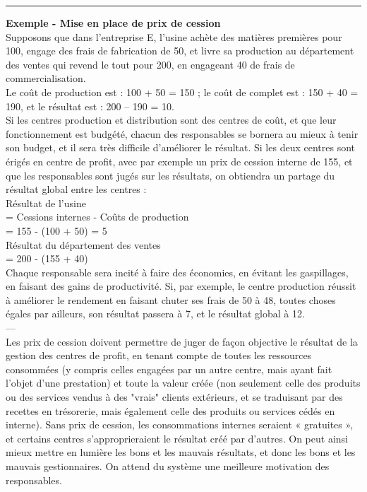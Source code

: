 \documentclass{kaobook}
\begin{document}
\noindent\rule{\textwidth}{0.5pt}
\textbf{Exemple - Mise en place de prix de cession}\\
Supposons que dans l’entreprise E, l'usine achète des matières premières pour 100, engage des frais de fabrication de 50, et livre sa production au département des ventes qui revend le tout pour 200, en engageant 40 de frais de commercialisation.\\
Le coût de production est : 100 + 50 = 150 ; le coût de complet est : 150 + 40 = 190, et le résultat est : 200 – 190 = 10.\\
Si les centres production et distribution sont des centres de coût, et que leur fonctionnement est budgété, chacun des responsables se bornera au mieux à tenir son budget, et il sera très difficile d’améliorer le résultat. Si les deux centres sont érigés en centre de profit, avec par exemple un prix de cession interne de 155, et que les responsables sont jugés sur les résultats, on obtiendra un partage du résultat global entre les centres :\\
Résultat de l'usine\\
= Cessions internes - Coûts de production\\
= 155 - (100 + 50) = 5\\
Résultat du département des ventes\\
= 200 - (155 + 40)\\
Chaque responsable sera incité à faire des économies, en évitant les gaspillages, en faisant des gains de productivité. Si, par exemple, le centre production réussit à améliorer le rendement en faisant chuter ses frais de 50 à 48, toutes choses égales par ailleurs, son résultat passera à 7, et le résultat global à 12.\\
---\\

Les prix de cession doivent permettre de juger de façon objective le résultat de la gestion des centres de profit, en tenant compte de toutes les ressources consommées (y compris celles engagées par un autre centre, mais ayant fait l’objet d’une prestation) et toute la valeur créée (non seulement celle des produits ou des services vendus à des "vrais" clients extérieurs, et se traduisant par des recettes en trésorerie, mais également celle des produits ou services cédés en interne). Sans prix de cession, les consommations internes seraient « gratuites », et certains centres s’approprieraient le résultat créé par d’autres. On peut ainsi mieux mettre en lumière les bons et les mauvais résultats, et donc les bons et les mauvais gestionnaires. On attend du système une meilleure motivation des responsables.\\
\end{document}
